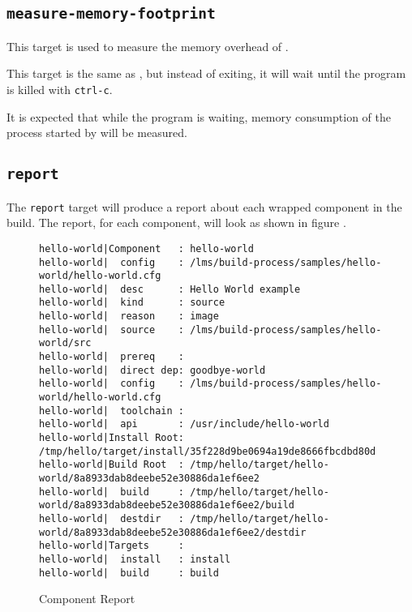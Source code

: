 \subsection{\texttt{measure-memory-footprint}}

This target is used to measure the memory overhead of \lmsbw.

This target is the same as , but
instead of exiting, it will wait until the program is killed with
\texttt{ctrl-c}.

It is expected that while the program is waiting, memory consumption
of the \make process started by \lmsbw will be measured.

\subsection{\texttt{report}}\label{usinglmsbw:report}

The \texttt{report} target will produce a report about each wrapped
component in the build.  The report, for each component, will look
as shown in figure .

\begin{landscape}
\begin{figure}
\hrulefill
\begin{small}
\begin{verbatim}
hello-world|Component   : hello-world
hello-world|  config    : /lms/build-process/samples/hello-world/hello-world.cfg
hello-world|  desc      : Hello World example
hello-world|  kind      : source
hello-world|  reason    : image
hello-world|  source    : /lms/build-process/samples/hello-world/src
hello-world|  prereq    :
hello-world|  direct dep: goodbye-world
hello-world|  config    : /lms/build-process/samples/hello-world/hello-world.cfg
hello-world|  toolchain :
hello-world|  api       : /usr/include/hello-world
hello-world|Install Root: /tmp/hello/target/install/35f228d9be0694a19de8666fbcdbd80d
hello-world|Build Root  : /tmp/hello/target/hello-world/8a8933dab8deebe52e30886da1ef6ee2
hello-world|  build     : /tmp/hello/target/hello-world/8a8933dab8deebe52e30886da1ef6ee2/build
hello-world|  destdir   : /tmp/hello/target/hello-world/8a8933dab8deebe52e30886da1ef6ee2/destdir
hello-world|Targets     :
hello-world|  install   : install
hello-world|  build     : build
\end{verbatim}
\end{small}
\hrulefill
\caption{Component Report}\label{usinglmsbw:component-report}
\end{figure}
\end{landscape}

